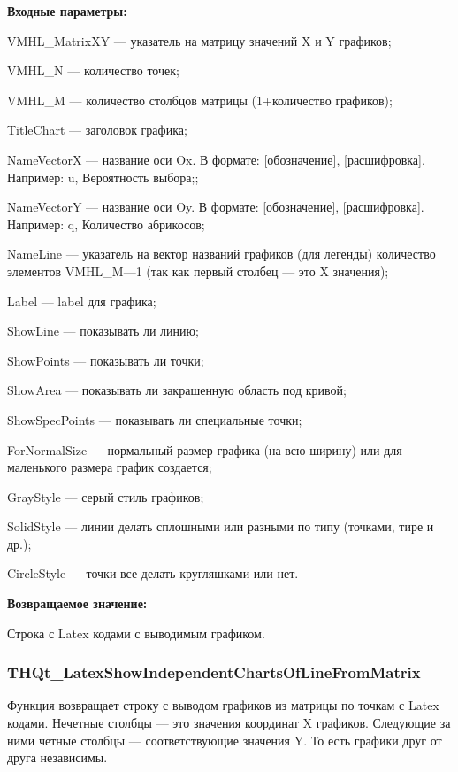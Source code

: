 \documentclass[a4paper,12pt]{article}
\begin{document}
\textbf{Входные параметры:}
 
VMHL\_MatrixXY --- указатель на матрицу значений X и Y графиков;
 
    VMHL\_N --- количество точек;
 
    VMHL\_M --- количество столбцов матрицы (1+количество графиков);
 
    TitleChart --- заголовок графика;
 
    NameVectorX --- название оси Ox. В формате: [обозначение], [расшифровка]. Например: u, Вероятность выбора;;
 
    NameVectorY --- название оси Oy. В формате: [обозначение], [расшифровка]. Например: q, Количество абрикосов;
 
    NameLine --- указатель на вектор названий графиков (для легенды) количество элементов VMHL\_M---1 (так как первый столбец --- это X значения);
 
    Label --- label для графика;
 
    ShowLine --- показывать ли линию;
 
    ShowPoints --- показывать ли точки;
 
    ShowArea --- показывать ли закрашенную область под кривой;
 
    ShowSpecPoints --- показывать ли специальные точки;
 
    ForNormalSize --- нормальный размер графика (на всю ширину) или для маленького размера график создается;
 
    GrayStyle --- серый стиль графиков;
 
    SolidStyle --- линии делать сплошными или разными по типу (точками, тире и др.);
 
    CircleStyle --- точки все делать кругляшками или нет.
	
\textbf{Возвращаемое значение:}

Строка с Latex кодами с выводимым графиком.


\subsubsection{THQt\_LatexShowIndependentChartsOfLineFromMatrix}\label{THQt_LatexShowIndependentChartsOfLineFromMatrix}

Функция возвращает строку с выводом графиков из матрицы по точкам с Latex кодами. Нечетные столбцы --- это значения координат X графиков. Следующие за ними четные столбцы --- соответствующие значения Y. То есть графики друг от друга независимы.
\end{document}
